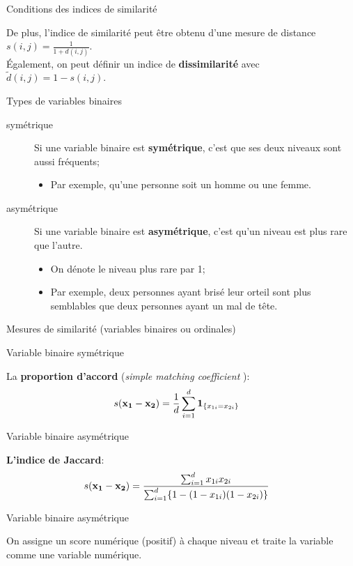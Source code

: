 \documentclass[10pt, french]{article}
\begin{document}
\begin{multicols*}{3}
\begin{conceptgen}{Conditions des indices de similarité}
\tcbline

De plus, l'indice de similarité peut être obtenu d'une mesure de distance $s(i, j) = \frac{1}{1 + d(i, j)}$.\\
Également, on peut définir un indice de \textbf{dissimilarité} avec $\tilde{d}(i, j) = 1 - s(i, j)$.
\end{conceptgen}

\begin{conceptgen}{Types de variables binaires}
\begin{description}
	\item[symétrique]	Si une variable binaire est \textbf{symétrique}, c'est que ses deux niveaux sont aussi fréquents;
		\begin{itemize}[leftmargin = *]
		\item	Par exemple, qu'une personne soit un homme ou une femme.
		\end{itemize}
	\item[asymétrique]	Si une variable binaire est \textbf{asymétrique}, c'est qu'un niveau est plus rare que l'autre.
		\begin{itemize}
		\item	On dénote le niveau plus rare par 1;
		\item	Par exemple, deux personnes ayant brisé leur orteil sont plus semblables que deux personnes ayant un mal de tête.
		\end{itemize}
\end{description}
\end{conceptgen}

\begin{conceptgen}{Mesures de similarité (variables binaires ou ordinales)}
\begin{center}
	Variable binaire symétrique
\end{center}
La \textbf{proportion d'accord} (\og \textit{simple matching coefficient} \fg{}):
\begin{align*}
	s(\mathbf{x_{1} - x_{2}})
	&=	\frac{1}{d}	\sum_{i = 1}^{d} \bm{1}_{\{x_{1i} = x_{2i}\}}
\end{align*}
\tcbline
\begin{center}
	Variable binaire asymétrique
\end{center}
\textbf{L'indice de Jaccard}:
\begin{align*}
	s(\mathbf{x_{1} - x_{2}})
	&=	\frac{\sum_{i = 1}^{d} x_{1i}x_{2i}}{\sum_{i = 1}^{d} \{1 - (1 - x_{1i})(1 - x_{2i})\}}
\end{align*}
\tcbline
\begin{center}
	Variable binaire asymétrique
\end{center}
On assigne un score numérique (positif) à chaque niveau et traite la variable comme une variable numérique.
\end{conceptgen}


\end{multicols*}
\end{document}
